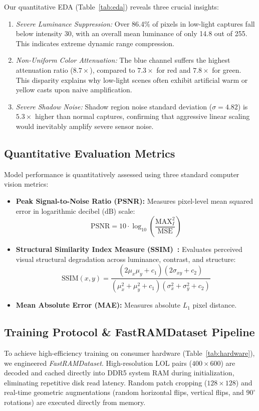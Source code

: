 \documentclass[conference]{IEEEtran}
\begin{document}
Our quantitative EDA (Table~\ref{tab:eda}) reveals three crucial insights:
\begin{enumerate}
    \item \textit{Severe Luminance Suppression:} Over 86.4\% of pixels in low-light captures fall below intensity 30, with an overall mean luminance of only 14.8 out of 255. This indicates extreme dynamic range compression.
    \item \textit{Non-Uniform Color Attenuation:} The blue channel suffers the highest attenuation ratio ($8.7\times$), compared to $7.3\times$ for red and $7.8\times$ for green. This disparity explains why low-light scenes often exhibit artificial warm or yellow casts upon naive amplification.
    \item \textit{Severe Shadow Noise:} Shadow region noise standard deviation ($\sigma=4.82$) is $5.3\times$ higher than normal captures, confirming that aggressive linear scaling would inevitably amplify severe sensor noise.
\end{enumerate}

\subsection{Quantitative Evaluation Metrics}
Model performance is quantitatively assessed using three standard computer vision metrics:
\begin{itemize}
    \item \textbf{Peak Signal-to-Noise Ratio (PSNR):} Measures pixel-level mean squared error in logarithmic decibel (dB) scale:
    \begin{equation}
      \mathrm{PSNR} = 10 \cdot \log_{10}\left( \frac{\mathrm{MAX}_I^2}{\mathrm{MSE}} \right)
      \label{eq:psnr}
    \end{equation}
    \item \textbf{Structural Similarity Index Measure (SSIM)~\cite{wang2004image}:} Evaluates perceived visual structural degradation across luminance, contrast, and structure:
    \begin{equation}
      \mathrm{SSIM}(x,y) = \frac{(2\mu_x\mu_y+c_1)(2\sigma_{xy}+c_2)}{(\mu_x^2+\mu_y^2+c_1)(\sigma_x^2+\sigma_y^2+c_2)}
      \label{eq:ssim}
    \end{equation}
    \item \textbf{Mean Absolute Error (MAE):} Measures absolute $L_1$ pixel distance.
\end{itemize}

\subsection{Training Protocol \& FastRAMDataset Pipeline}
To achieve high-efficiency training on consumer hardware (Table~\ref{tab:hardware}), we engineered \textit{FastRAMDataset}. High-resolution LOL pairs ($400\times600$) are decoded and cached directly into DDR5 system RAM during initialization, eliminating repetitive disk read latency. Random patch cropping ($128\times128$) and real-time geometric augmentations (random horizontal flips, vertical flips, and $90^\circ$ rotations) are executed directly from memory.
\end{document}
